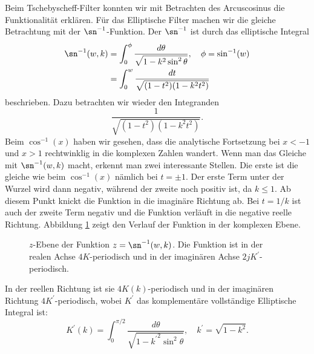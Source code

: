 Beim Tschebyscheff-Filter konnten wir mit Betrachten des Arcuscosinus die Funktionalität erklären.
Für das Elliptische Filter machen wir die gleiche Betrachtung mit der $\sn^{-1}$-Funktion.
Der $\sn^{-1}$ ist durch das elliptische Integral
\begin{align}
    \sn^{-1}(w, k)
        & =
    \int_{0}^{\phi}
    \frac{
        d\theta
    }{
        \sqrt{
            1-k^2 \sin^2 \theta
        }
    },
    \quad
    \phi = \sin^{-1}(w)
    \\
        & =
    \int_{0}^{w}
    \frac{
        dt
    }{
        \sqrt{
            (1-t^2)(1-k^2 t^2)
        }
    }
\end{align}
beschrieben.
Dazu betrachten wir wieder den Integranden
\begin{equation}
    \frac{
        1
    }{
        \sqrt{
            (1-t^2)(1-k^2 t^2)
        }
    }.
\end{equation}
Beim $\cos^{-1}(x)$ haben wir gesehen, dass die analytische Fortsetzung bei $x < -1$ und $x > 1$ rechtwinklig in die komplexen Zahlen wandert.
Wenn man das Gleiche mit $\sn^{-1}(w, k)$ macht, erkennt man zwei interessante Stellen.
Die erste ist die gleiche wie beim $\cos^{-1}(x)$ nämlich bei $t = \pm 1$.
Der erste Term unter der Wurzel wird dann negativ, während der zweite noch positiv ist, da $k \leq 1$.
Ab diesem Punkt knickt die Funktion in die imaginäre Richtung ab.
Bei $t = 1/k$ ist auch der zweite Term negativ und die Funktion verläuft in die negative reelle Richtung.
Abbildung \ref{ellfilter:fig:sn} zeigt den Verlauf der Funktion in der komplexen Ebene.
\begin{figure}
    \centering
    
    \caption{
        $z$-Ebene der Funktion $z = \sn^{-1}(w, k)$.
        Die Funktion ist in der realen Achse $4K$-periodisch und in der imaginären Achse $2jK^\prime$-periodisch.
    }
    \label{ellfilter:fig:sn}
\end{figure}
In der reellen Richtung ist sie $4K(k)$-periodisch und in der imaginären Richtung $4K^\prime$-periodisch, wobei $K^\prime$ das komplementäre vollständige Elliptische Integral ist:
\begin{equation}
    K^\prime(k)
    =
    \int_{0}^{\pi / 2}
    \frac{
        d\theta
    }{
        \sqrt{
            1-{k^\prime}^2 \sin^2 \theta
        }
    },
    \quad
    k^\prime = \sqrt{1-k^2}.
\end{equation}
